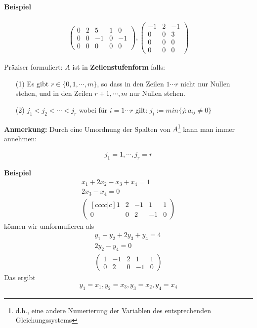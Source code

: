 \documentclass[11pt]{report}
\newcommand*\f[1] {\textbf{#1}}
\begin{document}
\paragraph{Beispiel}
\begin{align}
 \begin{pmatrix}
  0 & 2 & 5 & 1 & 0 \\
  0 & 0 & -1 & 0 & -1 \\
  0 & 0 & 0 & 0 & 0
 \end{pmatrix},
 \begin{pmatrix}
  -1 & 2 & -1 \\
  0 & 0 & 3  \\
  0 & 0 & 0 \\
  0 & 0 & 0
 \end{pmatrix}
\end{align}

Präziser formuliert: $A$ ist in \f{Zeilenstufenform} falls:
\begin{itemize}
 \item[(1)] Es gibt $r \in \{0 ,1, \cdots, m\}$, so dass in den Zeilen $1 \cdots r$ nicht nur Nullen stehen, und in den Zeilen $r+1, \cdots, m$ nur Nullen stehen.
 \item[(2)] $j_1 < j_2 < \cdots < j_r$ wobei für $i=1\cdots r$ gilt: $j_i := min\{j: a_{ij} \neq 0\}$
\end{itemize}

\f{Anmerkung:} Durch eine Umordnung der Spalten von $A$\footnote{d.h., eine andere Numerierung der Variablen des entsprechenden Gleichungssystems} kann man immer annehmen:

\begin{align}
 j_1 = 1, \cdots, j_r = r
\end{align}

\f{Beispiel}
\begin{align}
x_1 + 2 x_2 - x_3 + x_4 = 1 \\
2x_3 - x_4 = 0 \\
\begin{pmatrix}[cccc|c]
1 & 2 & -1 & 1 & 1 \\
0 & 0 & 2 & -1 & 0
\end{pmatrix}
\end{align}
können wir umformulieren als
\begin{align}
y_1 - y_2 + 2y_3 + y_4 = 4 \\
2y_2 -y_4 = 0 \\
\begin{pmatrix}
1 & -1 & 2 & 1 & 1 \\
0 & 2 & 0 & -1 & 0
\end{pmatrix}
\end{align}
Das ergibt
\begin{align}
y_1=x_1, y_2=x_3, y_3 = x_2, y_4 = x_4
\end{align}
\end{document}
